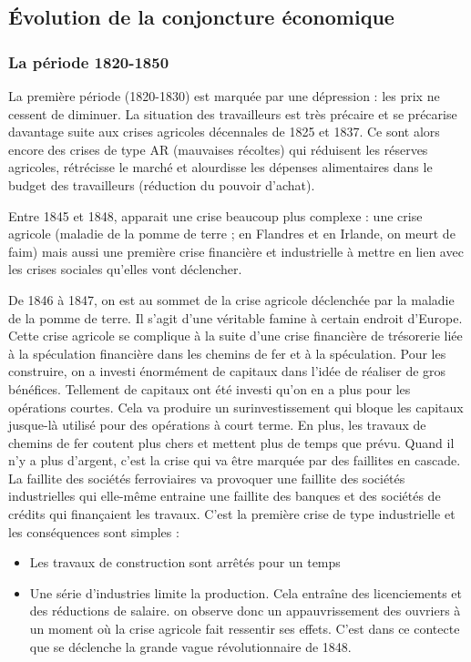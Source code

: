 \documentclass[12pt]{report}
\begin{document}
\subsection{Évolution de la conjoncture économique}

\subsubsection{La période 1820-1850}

La première période (1820-1830) est marquée par une dépression : les prix ne cessent de
diminuer. La situation des travailleurs est très précaire et se précarise davantage suite aux
crises agricoles décennales de 1825 et 1837. Ce sont alors encore des crises de type AR
(mauvaises récoltes) qui réduisent les réserves agricoles, rétrécisse le marché et alourdisse les
dépenses alimentaires dans le budget des travailleurs (réduction du pouvoir d’achat).

Entre 1845 et 1848, apparait une crise beaucoup plus complexe : une crise agricole (maladie
de la pomme de terre ; en Flandres et en Irlande, on meurt de faim) mais aussi une première
crise financière et industrielle à mettre en lien avec les crises sociales qu’elles vont
déclencher.

De 1846 à 1847, on est au sommet de la crise agricole déclenchée par la maladie de la pomme
de terre. Il s’agit d’une véritable famine à certain endroit d’Europe. Cette crise agricole se
complique à la suite d’une crise financière de trésorerie liée à la spéculation financière dans
les chemins de fer et à la spéculation. Pour les construire, on a investi énormément de
capitaux dans l’idée de réaliser de gros bénéfices. Tellement de capitaux ont été investi qu’on
en a plus pour les opérations courtes. Cela va produire un surinvestissement qui bloque les
capitaux jusque-là utilisé pour des opérations à court terme. En plus, les travaux de chemins
de fer coutent plus chers et mettent plus de temps que prévu. Quand il n’y a plus d’argent,
c’est la crise qui va être marquée par des faillites en cascade. La faillite des sociétés
ferroviaires va provoquer une faillite des sociétés industrielles qui elle-même entraine une
faillite des banques et des sociétés de crédits qui finançaient les travaux. C’est la première
crise de type industrielle et les conséquences sont simples :

\begin{itemize}
	\item Les travaux de construction sont arrêtés pour un temps
	\item Une série d'industries limite la production. Cela entraîne des licenciements et des réductions de salaire. on observe donc un appauvrissement des ouvriers à un moment où la crise agricole fait ressentir ses effets. C'est dans ce contecte que se déclenche la grande vague révolutionnaire de 1848.
\end{itemize}
\end{document}
